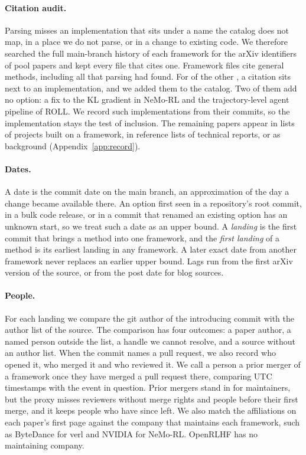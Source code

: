 \documentclass{article}
\begin{document}
\paragraph{Citation audit.} Parsing misses an implementation that sits under a name the catalog does not map, in a place we do not parse, or in a change to existing code. We therefore searched the full main-branch history of each framework for the arXiv identifiers of pool papers and kept every file that cites one. Framework files cite \NAuditCited{} general methods, including all \NAuditBefore{} that parsing had found. For \NAuditAdded{} of the other \NAuditUnmatched{}, a citation sits next to an implementation, and we added them to the catalog. Two of them add no option: a fix to the KL gradient in NeMo-RL and the trajectory-level agent pipeline of ROLL. We record such implementations from their commits, so the implementation stays the test of inclusion. The remaining papers appear in lists of projects built on a framework, in reference lists of technical reports, or as background (Appendix~\ref{app:record}).

\paragraph{Dates.} A date is the commit date on the main branch, an approximation of the day a change became available there. An option first seen in a repository's root commit, in a bulk code release, or in a commit that renamed an existing option has an unknown start, so we treat such a date as an upper bound. A \emph{landing} is the first commit that brings a method into one framework, and the \emph{first landing} of a method is its earliest landing in any framework. A later exact date from another framework never replaces an earlier upper bound. Lags run from the first arXiv version of the source, or from the post date for blog sources.

\paragraph{People.} For each landing we compare the git author of the introducing commit with the author list of the source. The comparison has four outcomes: a paper author, a named person outside the list, a handle we cannot resolve, and a source without an author list. When the commit names a pull request, we also record who opened it, who merged it and who reviewed it. We call a person a prior merger of a framework once they have merged a pull request there, comparing UTC timestamps with the event in question. Prior mergers stand in for maintainers, but the proxy misses reviewers without merge rights and people before their first merge, and it keeps people who have since left. We also match the affiliations on each paper's first page against the company that maintains each framework, such as ByteDance for verl and NVIDIA for NeMo-RL. OpenRLHF has no maintaining company.
\end{document}
